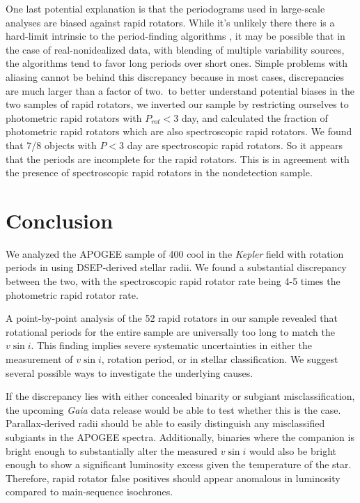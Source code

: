 \documentclass[manuscript]{aastex6}
\newcommand{\vsini}{\ensuremath{v \sin i}}
\newcommand{\Kepler}{\mbox{\textit{Kepler}}}
\newcommand{\Gaia}{\mbox{\textit{Gaia}}}
\begin{document}
{One last potential explanation is that the periodograms used in large-scale
analyses are biased against rapid rotators. While it's unlikely there there is
a hard-limit intrinsic to the period-finding algorithms \citep{Aigrain15}, it
may be possible that in the case of real-nonidealized data, with blending of
multiple variability sources, the algorithms tend to favor long periods over
short ones. Simple problems with aliasing cannot be behind this discrepancy
because in most cases, discrepancies are much larger than a factor of two.\ to
better understand potential biases in the two samples of rapid rotators, we
inverted our sample by restricting ourselves to photometric rapid rotators with
\(P_{rot} < 3\) day, and calculated the fraction of photometric rapid rotators
which are also spectroscopic rapid rotators. We found that 7/8 objects
with \(P < 3\) day are spectroscopic rapid rotators. So it appears that the
\citet{McQuillan14} periods are incomplete for the rapid rotators. This is in
agreement with the presence of spectroscopic rapid rotators in the
\citet{McQuillan14} nondetection sample.

\section{Conclusion}
\label{sec:conclusions}

We analyzed the APOGEE sample of 400 cool in the \Kepler{} field with 
rotation periods in \citet{McQuillan14} using DSEP-derived stellar radii. We 
found a substantial discrepancy between the two, with the spectroscopic rapid
rotator rate being 4-5 times the photometric rapid rotator rate. 

A point-by-point analysis of the 52 rapid rotators in our sample revealed that
rotational periods for the entire sample are universally too long to match the 
\vsini{}. This finding implies severe systematic uncertainties in either the
measurement of \vsini{}, rotation period, or in stellar classification. We
suggest several possible ways to investigate the underlying causes.

If the discrepancy lies with either concealed binarity or subgiant
misclassification, the upcoming \Gaia{} data release would be able to
test whether this is the case. Parallax-derived radii should be able to
easily distinguish any misclassified subgiants in the APOGEE spectra.
Additionally, binaries where the companion is bright enough to
substantially alter the measured \vsini{} would also be bright enough to
show a significant luminosity excess given the temperature of the star.
Therefore, rapid rotator false positives should appear anomalous in
luminosity compared to main-sequence isochrones.

}
\end{document}

